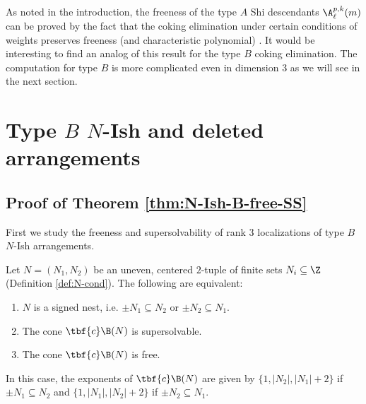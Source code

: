 As noted in the introduction, the freeness of the type $A$ Shi descendants $\A^{p,k}_\ell(m)$ can be proved by the fact that the coking elimination under certain conditions of weights preserves freeness (and  characteristic polynomial)  \cite[Theorems 3.1 and 4.1]{ATT24}.
It would be interesting to find an analog of this result for the type $B$ coking elimination.
The computation for type $B$ is more complicated even in dimension $3$ as we will see in the next section. 
\section{Type \texorpdfstring{$B$}{B} \texorpdfstring{$N$}{N}-Ish and deleted arrangements}
\label{sec:NI-deleted}


\subsection{Proof of Theorem  \ref{thm:N-Ish-B-free-SS}}
\label{subsec:F-SS-NI}
First we study the freeness and supersolvability of rank $3$ localizations of type $B$ $N$-Ish arrangements.
\begin{proposition}
 \label{prop:N-l=2}
 Let $N = (N_1, N_2)$ be  an uneven, centered $2$-tuple  of finite sets $N_i \subseteq \Z$ (Definition \ref{def:N-cond}).
 The following are equivalent:
 \begin{enumerate}[(1)]
\item $N$ is a signed nest, i.e. $\pm N_1 \subseteq N_2$ or $\pm N_2 \subseteq N_1$.
\item  The cone $\tbf{c}\B(N)$ is supersolvable.
\item The cone $\tbf{c}\B(N)$  is  free.
\end{enumerate}
In this case, the exponents of  $\tbf{c}\B(N)$ are given by $\{1, |N_2| , |N_1| + 2\}$ if  $\pm N_1 \subseteq N_2$ and $\{1, |N_1| , |N_2| + 2\}$ if  $\pm N_2 \subseteq N_1$.
\end{proposition}

